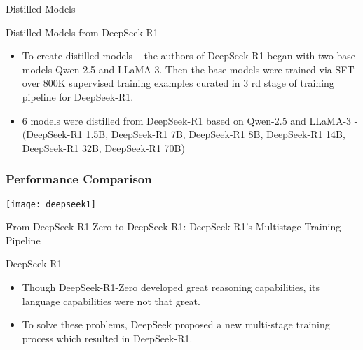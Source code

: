 \begin{frame}[fragile]{ Distilled Models}

Distilled Models from DeepSeek-R1

    \begin{itemize}
        \item   To create distilled models – the authors of DeepSeek-R1 began with two 
base models Qwen-2.5  and LLaMA-3. Then the base models were trained 
via SFT over 800K supervised training examples curated in 3 rd  stage of 
training pipeline for DeepSeek-R1. 
        \item  6 models were distilled from DeepSeek-R1 based on Qwen-2.5 and 
LLaMA-3 - (DeepSeek-R1 1.5B, DeepSeek-R1 7B, DeepSeek-R1 8B, 
DeepSeek-R1 14B, DeepSeek-R1 32B, DeepSeek-R1 70B)
    \end{itemize}
\end{frame}


\begin{frame}[fragile]\frametitle{ Performance Comparison}
		\begin{center}
		\texttt{[image: deepseek1]}
		
				{\textbf From DeepSeek-R1-Zero to DeepSeek-R1: DeepSeek-R1's Multistage Training Pipeline}

		\end{center}

\end{frame}

\begin{frame}[fragile]{DeepSeek-R1}


    \begin{itemize}
        \item  Though DeepSeek-R1-Zero developed great reasoning capabilities, its 
language capabilities were not that great.
        \item  To solve these problems,  DeepSeek proposed a new multi-stage  
training process which resulted in DeepSeek-R1.
    \end{itemize}
\end{frame}



